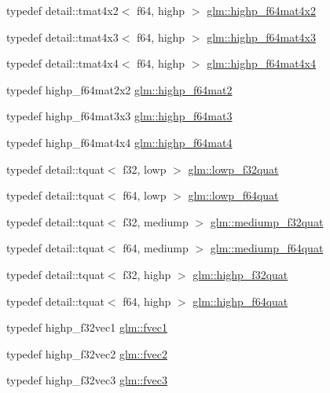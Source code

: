 \begin{CompactItemize}
typedef detail::tmat4x2$<$ f64, highp $>$ \hyperlink{group__gtc__type__precision_gbe9bc3680e7d83a7b34297da518a8117}{glm::highp\_\-f64mat4x2}
\item 
typedef detail::tmat4x3$<$ f64, highp $>$ \hyperlink{group__gtc__type__precision_g0264562b4667b8073b7708efc2280691}{glm::highp\_\-f64mat4x3}
\item 
typedef detail::tmat4x4$<$ f64, highp $>$ \hyperlink{group__gtc__type__precision_ga95b52552df369b75d09155ebb29b1bd}{glm::highp\_\-f64mat4x4}
\item 
typedef highp\_\-f64mat2x2 \hyperlink{group__gtc__type__precision_g7d9fd446fd43310ba6f63c8f9468acc0}{glm::highp\_\-f64mat2}
\item 
typedef highp\_\-f64mat3x3 \hyperlink{group__gtc__type__precision_g00c5743b0eba6b437422571f4eda27b8}{glm::highp\_\-f64mat3}
\item 
typedef highp\_\-f64mat4x4 \hyperlink{group__gtc__type__precision_g1ac5d0564721a22765c68c54a0a4f87a}{glm::highp\_\-f64mat4}
\item 
typedef detail::tquat$<$ f32, lowp $>$ \hyperlink{group__gtc__type__precision_g83edc5f21bfa41f72f881b29aabbd919}{glm::lowp\_\-f32quat}
\item 
typedef detail::tquat$<$ f64, lowp $>$ \hyperlink{group__gtc__type__precision_g225e6f95dd6a7049b1a86db23b90cbac}{glm::lowp\_\-f64quat}
\item 
typedef detail::tquat$<$ f32, mediump $>$ \hyperlink{group__gtc__type__precision_gb038e3482ca401bca2b2634c96f44f09}{glm::mediump\_\-f32quat}
\item 
typedef detail::tquat$<$ f64, mediump $>$ \hyperlink{group__gtc__type__precision_g7cf626acf7f4fc29355c147bfe05163d}{glm::mediump\_\-f64quat}
\item 
typedef detail::tquat$<$ f32, highp $>$ \hyperlink{group__gtc__type__precision_g26eef27d2efbd759e7e93c40672402e9}{glm::highp\_\-f32quat}
\item 
typedef detail::tquat$<$ f64, highp $>$ \hyperlink{group__gtc__type__precision_g9372e8b60f401fd94aba637b3ed17cfc}{glm::highp\_\-f64quat}
\item 
typedef highp\_\-f32vec1 \hyperlink{group__gtc__type__precision_gb927d62f22fa57461367011950cec650}{glm::fvec1}
\item 
typedef highp\_\-f32vec2 \hyperlink{group__gtc__type__precision_gafd518792a4646c7bb60aabc62a4684c}{glm::fvec2}
\item 
typedef highp\_\-f32vec3 \hyperlink{group__gtc__type__precision_g33b85a14a8f68ec99029ff13db6af369}{glm::fvec3}

\end{CompactItemize}
